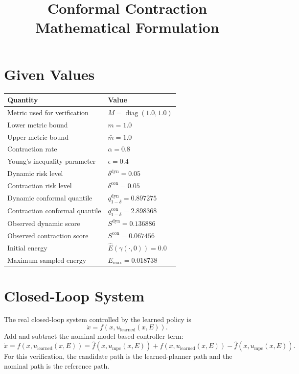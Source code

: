 \documentclass[11pt]{article}
\title{\textbf{Conformal Contraction Mathematical Formulation}}
\author{}
\date{}
\begin{document}
\maketitle

\section*{Given Values}

\begin{center}
\begin{tabular}{ll}
\toprule
Quantity & Value \\
\midrule
Metric used for verification & \(M=\operatorname{diag}(1.0,1.0)\) \\
Lower metric bound & \(m=1.0\) \\
Upper metric bound & \(\bar m=1.0\) \\
Contraction rate & \(\alpha=0.8\) \\
Young's inequality parameter & \(\epsilon=0.4\) \\
Dynamic risk level & \(\delta^{\mathrm{dyn}}=0.05\) \\
Contraction risk level & \(\delta^{\mathrm{con}}=0.05\) \\
Dynamic conformal quantile & \(q_{1-\delta}^{\mathrm{dyn}}=0.897275\) \\
Contraction conformal quantile & \(q_{1-\delta}^{\mathrm{con}}=2.898368\) \\
Observed dynamic score & \(S^{\mathrm{dyn}}=0.136886\) \\
Observed contraction score & \(S^{\mathrm{con}}=0.067456\) \\
Initial energy & \(\hat E(\gamma(\cdot,0))=0.0\) \\
Maximum sampled energy & \(E_{\max}=0.018738\) \\
\bottomrule
\end{tabular}
\end{center}

\section*{Closed-Loop System}

The real closed-loop system controlled by the learned policy is
\[
\dot x=f(x,u_{\mathrm{learned}}(x,E)).
\]
Add and subtract the nominal model-based controller term:
\[
\dot x
=f(x,u_{\mathrm{learned}}(x,E))
=\hat f(x,u_{\mathrm{mpc}}(x,E))
+f(x,u_{\mathrm{learned}}(x,E))-\hat f(x,u_{\mathrm{mpc}}(x,E)).
\]
For this verification, the candidate path is the learned-planner path and the nominal path is the reference path.
\end{document}
